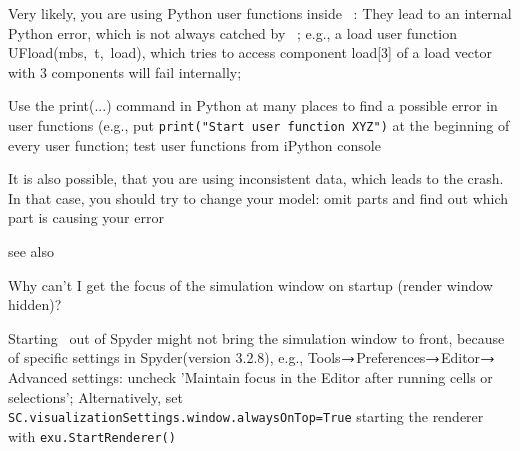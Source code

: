 %
\item[$\ra$] Very likely, you are using Python user functions inside \codeName\ : They lead to an internal Python error, which is not always catched by \codeName\ ; e.g., a load user function UFload(mbs,~t,~load), which tries to access component load[3] of a load vector with 3 components will fail internally;
%
\item[$\ra$] Use the print(...) command in Python at many places to find a possible error in user functions (e.g., put \texttt{print("Start user function XYZ")} at the beginning of every user function; test user functions from iPython console
%
\item[$\ra$] It is also possible, that you are using inconsistent data, which leads to the crash. In that case, you should try to change your model: omit parts and find out which part is causing your error
%
\item[$\ra$] see also 
\ei

\item Why can't I get the focus of the simulation window on startup (render window hidden)?
\bi
\item[$\ra$] Starting \codeName\ out of Spyder might not bring the simulation window to front, because of specific settings in Spyder(version 3.2.8), e.g., Tools$\ra$Preferences$\ra$Editor$\ra$Advanced settings: uncheck 'Maintain focus in the Editor after running cells or selections'; Alternatively, set \texttt{SC.visualizationSettings.window.alwaysOnTop=True}  starting the renderer with \texttt{exu.StartRenderer()}
\ei
%
\en


